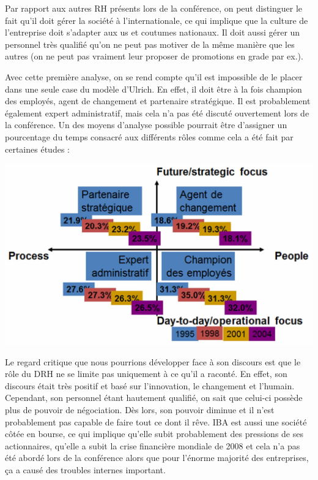 \documentclass[12pt]{article}
\begin{document}
Par rapport aux autres RH présents lors de la conférence, on peut distinguer le fait qu'il doit gérer la société à l'internationale, ce qui implique que la culture de l'entreprise doit s'adapter aux us et coutumes nationaux. Il doit aussi gérer un personnel très qualifié qu'on ne peut pas motiver de la même manière que les autres (on ne peut pas vraiment leur proposer de promotions en grade par ex.).

Avec cette première analyse, on se rend compte qu'il est impossible de le placer dans une seule case du modèle d'Ulrich. En effet, il doit être à la fois champion des employés, agent de changement et partenaire stratégique. Il est probablement également expert administratif, mais cela n'a pas été discuté ouvertement lors de la conférence.
Un des moyens d'analyse possible pourrait être d'assigner un pourcentage du temps consacré aux différents rôles comme cela a été fait par certaines études :

\includegraphics[width=\linewidth]{ulrich_pourcentage.png}

Le regard critique que nous pourrions développer face à son discours est que le rôle du DRH ne se limite pas uniquement à ce qu'il a raconté. En effet, son discours était très positif et basé sur l'innovation, le changement et l'humain. Cependant, son personnel étant hautement qualifié, on sait que celui-ci possède plus de pouvoir de négociation. Dès lors, son pouvoir diminue et il n'est probablement pas capable de faire tout ce dont il rêve. IBA est aussi une société côtée en bourse, ce qui implique qu'elle subit probablement des pressions de ses actionnaires, qu'elle a subit la crise financière mondiale de 2008 et cela n'a pas été abordé lors de la conférence alors que pour l'énorme majorité des entreprises, ça a causé des troubles internes important.
\end{document}
